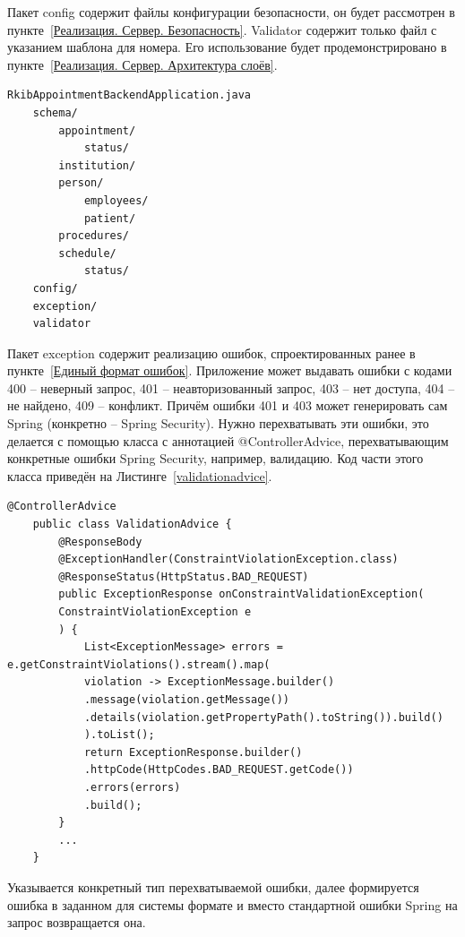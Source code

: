 \documentclass[a4paper,article]{article}
\begin{document}
\begin{sloppypar}
    Пакет config содержит файлы конфигурации безопасности, он будет рассмотрен в пункте~\ref{Реализация. Сервер. Безопасность}. Validator содержит только файл с указанием шаблона для номера. Его использование будет продемонстрировано в пункте~\ref{Реализация. Сервер. Архитектура слоёв}.

    \begin{lstlisting}[label=backendprojectstructure,caption=Структура серверного приложения]
    RkibAppointmentBackendApplication.java
    schema/
        appointment/
            status/
        institution/
        person/
            employees/
            patient/
        procedures/
        schedule/
            status/
    config/
    exception/
    validator
    \end{lstlisting}

    Пакет exception содержит реализацию ошибок, спроектированных ранее в пункте~\ref{Единый формат ошибок}. Приложение может выдавать ошибки с кодами 400 -- неверный запрос, 401 -- неавторизованный запрос, 403 -- нет доступа, 404 -- не найдено, 409 -- конфликт. Причём ошибки 401 и 403 может генерировать сам Spring (конкретно -- Spring Security). Нужно перехватывать эти ошибки, это делается с помощью класса с аннотацией @ControllerAdvice, перехватывающим конкретные ошибки Spring Security, например, валидацию. Код части этого класса приведён на Листинге~\ref{validationadvice}.

    \begin{lstlisting}[label=validationadvice,caption=Класс-прехватчик ошибок Spring]
    @ControllerAdvice
    public class ValidationAdvice {
        @ResponseBody
        @ExceptionHandler(ConstraintViolationException.class)
        @ResponseStatus(HttpStatus.BAD_REQUEST)
        public ExceptionResponse onConstraintValidationException(
        ConstraintViolationException e
        ) {
            List<ExceptionMessage> errors = e.getConstraintViolations().stream().map(
            violation -> ExceptionMessage.builder()
            .message(violation.getMessage())
            .details(violation.getPropertyPath().toString()).build()
            ).toList();
            return ExceptionResponse.builder()
            .httpCode(HttpCodes.BAD_REQUEST.getCode())
            .errors(errors)
            .build();
        }
        ...
    }
    \end{lstlisting}

    Указывается конкретный тип перехватываемой ошибки, далее формируется ошибка в заданном для системы формате и вместо стандартной ошибки Spring на запрос возвращается она.


\end{sloppypar}
\end{document}
